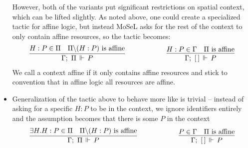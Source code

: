 \begin{itemize}
  However, both of the variants put significant restrictions on spatial context, which can be lifted slightly.
  As noted above, one could create a specialized tactic for affine logic, but instead MoSeL asks for the rest of the context to only contain affine resources, so the tactic becomes:
  \begin{align*}
      \infer%
        {\entailsD P}
        {H : P \in \SpatD &
         \SpatD \backslash (H : P) \text{ is affine}}
    & \hspace{5em}
    & \infer%
        {\entails {\IntuD} {[\,]} P}
        {H : P \in \IntuD &
         \SpatD \text{ is affine}}
  \end{align*}
  We call a context affine if it only contains affine resources and stick to convention that in affine logic all resources are affine.
\item Generalization of the tactic above to behave more like  is trivial -- instead of asking for a specific \(H : P\) to be in the context, we ignore identifiers entirely and the assumption becomes that there is some \(P\) in the context
  \begin{align*}
      \infer%
        {\entailsD P}
        {\exists H. H : P \in \SpatD &
         \SpatD \backslash (H : P) \text{ is affine}}
    & \hspace{5em}
    & \infer%
        {\entails {\IntuD} {[\,]} P}
        {P \in \IntuD &
         \SpatD \text{ is affine}}
  \end{align*}
\end{itemize}

